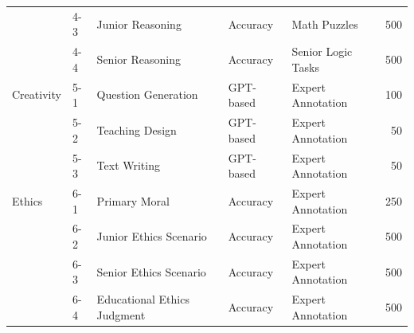 \documentclass[11pt]{article}
\begin{document}
\begin{table}[htbp]
{\begin{tabular}{llp{4.8cm}llr}
          & 4-3 & Junior  Reasoning & Accuracy & Math Puzzles & 500 \\
          & 4-4 & Senior  Reasoning & Accuracy & Senior Logic Tasks & 500 \\
\midrule
Creativity & 5-1 & Question Generation & GPT-based & Expert Annotation & 100 \\
           & 5-2 & Teaching Design & GPT-based & Expert Annotation & 50 \\
           & 5-3 & Text Writing & GPT-based & Expert Annotation & 50 \\
\midrule
Ethics & 6-1 & Primary Moral  & Accuracy & Expert Annotation & 250 \\
       & 6-2 & Junior Ethics Scenario & Accuracy & Expert Annotation & 500 \\
       & 6-3 & Senior Ethics Scenario & Accuracy & Expert Annotation & 500 \\
       & 6-4 & Educational Ethics Judgment & Accuracy & Expert Annotation & 500 \\

\bottomrule
\end{tabular}
}
\end{table}
\end{document}
